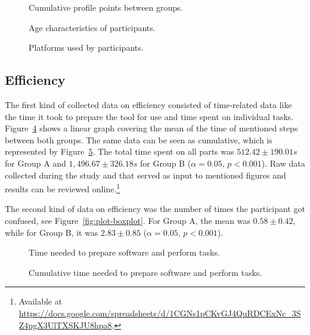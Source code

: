 \begin{figure}[H]
    
    \caption{Cumulative profile points between groups.}
    \label{fig:plot-points}
\end{figure}

\begin{figure}[H]
    
    \caption{Age characteristics of participants.}
    \label{fig:plot-age}
\end{figure}

\begin{figure}[H]
    
    \caption{Platforms used by participants.}
    \label{fig:plot-platform}
\end{figure}

\subsection{Efficiency}
\label{sec:evaluation-efficiency}

The first kind of collected data on efficiency consisted of time-related data like the time it took to prepare the tool for use and time spent on individual tasks.
Figure~\ref{fig:plot-linear} shows a linear graph covering the mean of the time of mentioned steps between both groups.
The same data can be seen as cumulative, which is represented by Figure~\ref{fig:plot-stacked-bar}.
The total time spent on all parts was $512.42 \pm 190.01 s$ for Group A and $1,496.67 \pm 326.18 s$ for Group B ($\alpha=0.05$, $p<0.001$).
Raw data collected during the study and that served as input to mentioned figures and results can be reviewed online.\footnote{Available at \url{https://docs.google.com/spreadsheets/d/1CGNs1pCKvGJ4QuRDCExNc_3SZ4pgX3UlTXSKJU8hpa8}.}

The second kind of data on efficiency was the number of times the participant got confused, see Figure~\ref{fig:plot-boxplot}.
For Group A, the mean was $0.58 \pm 0.42$, while for Group B, it was $2.83 \pm 0.85$ ($\alpha=0.05$, $p<0.001$).

\begin{figure}[H]
    
    \caption{Time needed to prepare software and perform tasks.}
    \label{fig:plot-linear}
\end{figure}

\begin{figure}[H]
    
    \caption{Cumulative time needed to prepare software and perform tasks.}
    \label{fig:plot-stacked-bar}
\end{figure}

